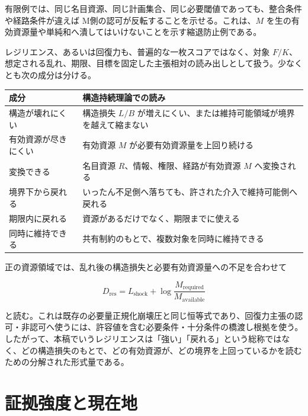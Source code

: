\documentclass[12pt,a4paper]{article}
\begin{document}
有限例では、同じ名目資源、同じ計画集合、同じ必要閾値であっても、整合条件や経路条件が違えば M側の認可が反転することを示せる。これは、\(M\) を生の有効資源量や単純和へ潰してはいけないことを示す縮退防止例である。

レジリエンス、あるいは回復力も、普遍的な一枚スコアではなく、対象 \(F/K\)、想定される乱れ、期限、目標を固定した主張相対の読み出しとして扱う。少なくとも次の成分は分ける。

{\def\LTcaptype{table} %
\begin{longtable}[]{@{}
  >{\raggedright\arraybackslash}p{}
  >{\raggedright\arraybackslash}p{}@{}}
\toprule\noalign{}
\begin{minipage}[b]{\linewidth}\raggedright
成分
\end{minipage} & \begin{minipage}[b]{\linewidth}\raggedright
構造持続理論での読み
\end{minipage} \\
\midrule\noalign{}
\endhead
\bottomrule\noalign{}
\endlastfoot
構造が壊れにくい & 構造損失 \(L/B\) が増えにくい、または維持可能領域が境界を越えて縮まない \\
有効資源が尽きにくい & 有効資源 \(M\) が必要有効資源量を上回り続ける \\
変換できる & 名目資源 \(R\)、情報、権限、経路が有効資源 \(M\) へ変換される \\
境界下から戻れる & いったん不足側へ落ちても、許された介入で維持可能側へ戻れる \\
期限内に戻れる & 資源があるだけでなく、期限までに使える \\
同時に維持できる & 共有制約のもとで、複数対象を同時に維持できる \\
\end{longtable}
}

正の資源領域では、乱れ後の構造損失と必要有効資源量への不足を合わせて

\[
D_{\mathrm{res}} =L_{\mathrm{shock}} +\log\frac{M_{\mathrm{required}}}{M_{\mathrm{available}}}
\]

と読む。これは既存の必要量正規化崩壊圧と同じ恒等式であり、回復力主張の認可・非認可へ使うには、許容値を含む必要条件・十分条件の橋渡し根拠を使う。したがって、本稿でいうレジリエンスは「強い」「戻れる」という総称ではなく、どの構造損失のもとで、どの有効資源が、どの境界を上回っているかを読むための分解された形式量である。

\section{証拠強度と現在地}\label{ux8a3cux62e0ux5f37ux5ea6ux3068ux73feux5728ux5730}
\end{document}
